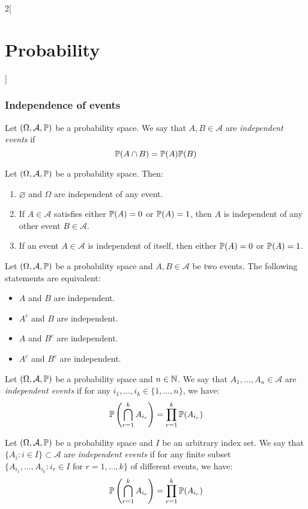 \documentclass[../../../main.tex]{subfiles}
\begin{document}
\begin{multicols}{2}[\section{Probability}]
  \subsubsection{Independence of events}
  \begin{definition}
    Let $(\Omega,\mathcal{A},\mathbb{P})$ be a probability space. We say that $A,B\in\mathcal{A}$ are \emph{independent events} if $$\mathbb{P}(A\cap B)=\mathbb{P}(A)\mathbb{P}(B)$$
  \end{definition}
  \begin{proposition}
    Let $(\Omega,\mathcal{A},\mathbb{P})$ be a probability space. Then:
    \begin{enumerate}
      \item $\varnothing$ and $\Omega$ are independent of any event.
      \item If $A\in\mathcal{A}$ satisfies either $\mathbb{P}(A)=0$ or $\mathbb{P}(A)=1$, then $A$ is independent of any other event $B\in\mathcal{A}$.
      \item If an event $A\in\mathcal{A}$ is independent of itself, then either $\mathbb{P}(A)=0$ or $\mathbb{P}(A)=1$.
    \end{enumerate}
  \end{proposition}
  \begin{proposition}
    Let $(\Omega,\mathcal{A},\mathbb{P})$ be a probability space and $A,B\in\mathcal{A}$ be two events. The following statements are equivalent:
    \begin{itemize}
      \item $A$ and $B$ are independent.
      \item $A^c$ and $B$ are independent.
      \item $A$ and $B^c$ are independent.
      \item $A^c$ and $B^c$ are independent.
    \end{itemize}
  \end{proposition}
  \begin{definition}
    Let $(\Omega,\mathcal{A},\mathbb{P})$ be a probability space and $n\in\mathbb{N}$. We say that $A_1,\ldots,A_n\in\mathcal{A}$ are \emph{independent events} if for any $i_1,\ldots,i_k\in\{1,\ldots,n\}$, we have: $$\mathbb{P}\left(\bigcap_{r=1}^kA_{i_r}\right)=\prod_{r=1}^k\mathbb{P}(A_{i_r})$$
  \end{definition}
  \begin{definition}
    Let $(\Omega,\mathcal{A},\mathbb{P})$ be a probability space and $I$ be an arbitrary index set. We say that $\{A_i:i\in I\}\subset\mathcal{A}$ are \emph{independent events} if for any finite subset $\{A_{i_1},\ldots, A_{i_k}:i_r\in I\text{ for }r=1,\ldots,k\}$ of different events, we have: $$\mathbb{P}\left(\bigcap_{r=1}^kA_{i_r}\right)=\prod_{r=1}^k\mathbb{P}(A_{i_r})$$
  \end{definition}

\end{multicols}
\end{document}
